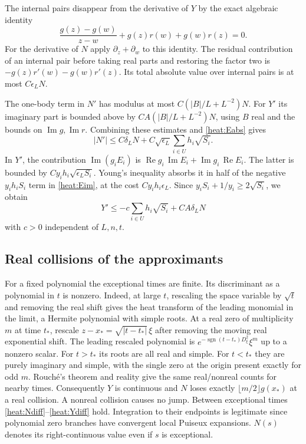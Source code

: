 \documentclass[11pt,a4paper]{article}
\numberwithin{equation}{section}
\renewcommand{\Re}{\operatorname{Re}}\renewcommand{\Im}{\operatorname{Im}}
\begin{document}
The internal pairs disappear from the derivative of $Y$ by the
exact algebraic identity
\[
 \frac{g(z)-g(w)}{z-w}+g(z)r(w)+g(w)r(z)=0.
\]
For the derivative of $N$ apply $\partial_z+\partial_w$ to this
identity. The residual contribution of an internal pair before
taking real parts and restoring the factor two is
$-g(z)r'(w)-g(w)r'(z)$. Its total absolute value over internal
pairs is at most $C\epsilon_L N$.

The one-body term in $N'$ has modulus at most
$C(|B|/L+L^{-2})N$. For $Y'$ its imaginary part is bounded above
by $CA(|B|/L+L^{-2})N$, using $B$ real and the bounds on
$\Im g,\Im r$. Combining these estimates and
\eqref{heat:Eabs} gives
\begin{equation}\label{heat:Ndiff}
 |N'|\le C\delta_L N+
 C\sqrt{\epsilon_L}\sum_{i\in U}h_i\sqrt{S_i}.
\end{equation}
In $Y'$, the contribution $\Im(g_iE_i)$ is
$\Re g_i\,\Im E_i+\Im g_i\,\Re E_i$. The latter is bounded by
$C y_i h_i\sqrt{\epsilon_L S_i}$. Young's inequality absorbs it
in half of the negative $y_i h_i S_i$ term in \eqref{heat:Eim},
at the cost $C y_i h_i\epsilon_L$. Since
$y_i S_i+1/y_i\ge2\sqrt{S_i}$, we obtain
\begin{equation}\label{heat:Ydiff}
 Y'\le -c\sum_{i\in U}h_i\sqrt{S_i}+CA\delta_L N
\end{equation}
with $c>0$ independent of $L,n,t$.

\subsection{Real collisions of the approximants}
For a fixed polynomial the exceptional times are finite. Its
discriminant as a polynomial in $t$ is nonzero. Indeed, at large $t$, rescaling the space variable by $\sqrt t$ and
removing the real shift gives the heat transform of the leading
monomial in the limit, a Hermite polynomial with simple roots.
At a real zero of multiplicity $m$ at time $t_*$, rescale
$z-x_*=\sqrt{|t-t_*|}\,\xi$ after removing the moving real
exponential shift. The leading rescaled polynomial is
$e^{-\operatorname{sgn}(t-t_*)D_\xi^2}\xi^m$ up to a nonzero
scalar. For $t>t_*$ its roots are all real and simple. For
$t<t_*$ they are purely imaginary and simple, with the single
zero at the origin present exactly for odd $m$. Rouché's theorem
and reality give the same real/nonreal counts for nearby times.
Consequently $Y$ is continuous and $N$ loses exactly
$\lfloor m/2\rfloor g(x_*)$ at a real collision. A nonreal
collision causes no jump. Between exceptional times
\eqref{heat:Ndiff}--\eqref{heat:Ydiff} hold. Integration to their
endpoints is legitimate since polynomial zero branches have
convergent local Puiseux expansions. $N(s)$ denotes its
right-continuous value even if $s$ is exceptional.
\end{document}
